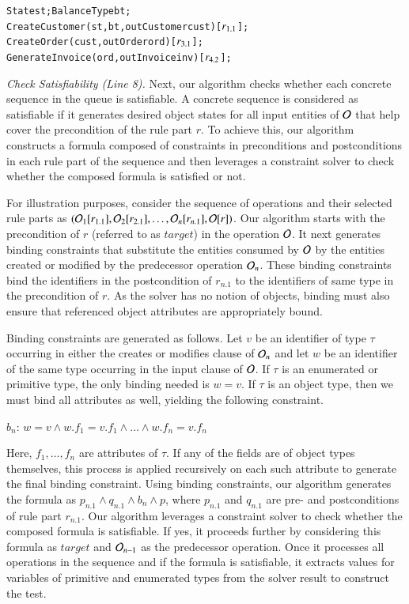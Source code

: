 \vspace*{-5pt}
{\small
\begin{alltt}
  State st; BalanceType bt;
  CreateCustomer(st, bt, out Customer cust) [\(r\sb{1.1}\)];
  CreateOrder(cust, out Order ord) [\(r\sb{3.1}\)];	
  GenerateInvoice(ord, out Invoice inv) [\(r\sb{4.2}\)];  
\end{alltt}
}
\vspace*{-5pt}

\textit{Check Satisfiability (Line 8).} Next, our algorithm checks whether 
each concrete sequence in the queue is satisfiable. A concrete sequence 
is considered as satisfiable if it generates desired
object states for all input entities of ${\cal O}$ that help cover the precondition of the rule
part $r$. To achieve this, our algorithm constructs a formula composed
of constraints in preconditions and postconditions in each rule part of the sequence
and then leverages a constraint solver to check whether the composed
formula is satisfied or not.

For illustration purposes, consider the sequence of operations and their selected
rule parts as $({\cal O}_1 [r_{1.1}], {\cal O}_2 [r_{2.1}], \ldots, {\cal O}_n [r_{n.1}], {\cal O} [r])$.
Our algorithm starts with the precondition of $r$ (referred to as $target$) in the operation ${\cal O}$. 
It next generates binding constraints that substitute the entities
consumed by ${\cal O}$ by the entities created or
modified by the predecessor operation ${\cal O}_n$. These binding constraints bind 
the identifiers in the postcondition of $r_{n.1}$ to the identifiers of same type
in the precondition of $r$. As the solver has no
notion of objects, binding must also ensure that referenced object attributes
are appropriately bound.

Binding constraints are generated as follows. Let $v$ be an
identifier of type $\tau$ occurring in either the creates or modifies
clause of ${\cal O}_n$ and let $w$ be an identifier of the same type
occurring in the input clause of ${\cal O}$. If $\tau$ is an enumerated or primitive type,
the only binding needed is $w = v$. If $\tau$ is an object type, then
we must bind all attributes as well, yielding the following constraint.

$b_n$: $w = v \wedge w.f_1 = v.f_1 \wedge \ldots \wedge w.f_n = v.f_n$ 

Here, $f_1, \ldots , f_n$ are attributes of $\tau$. If any of the
fields are of object types themselves, this process is applied
recursively on each such attribute to generate the final binding
constraint. Using binding constraints, our algorithm generates the formula as $p_{n.1} \wedge q_{n.1}
\wedge b_n \wedge p$, where $p_{n.1}$ and $q_{n.1}$ are pre- and postconditions
of rule part $r_{n.1}$. Our algorithm leverages a 
constraint solver to check whether the composed formula is satisfiable.
If yes, it proceeds further by considering
this formula as $target$ and ${\cal O}_{n-1}$ as the predecessor operation.
Once it processes all operations in the sequence and if the formula is satisfiable,
it extracts values for variables of primitive and enumerated types
from the solver result to construct the test. 

